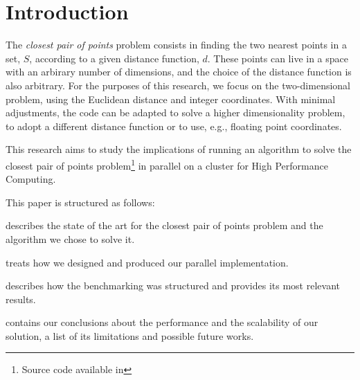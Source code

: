 \section{Introduction}
\label{sec:introduction}

The \textit{closest pair of points} problem consists
in finding the two nearest points in a set, $S$, according to a given distance function, $d$\cite{closest_pair_definition}.
These points can live in a space with an arbirary number of dimensions,
and the choice of the distance function is also arbitrary.
For the purposes of this research, we focus on the two-dimensional problem, using the Euclidean distance and integer coordinates.
With minimal adjustments, the code can be adapted to solve a higher dimensionality problem, to adopt a different distance function or to use, e.g., floating point coordinates.

This research aims to study the implications of running an algorithm to solve the closest pair of points problem\footnote{Source code available in } in parallel on a cluster for High Performance Computing.

This paper is structured as follows:
\begin{inlinelist}
    \item {} describes the state of the art for the closest pair of points problem and the algorithm we chose to solve it.
    \item {} treats how we designed and produced our parallel implementation.
    \item {} describes how the benchmarking was structured and
    provides its most relevant results.
    \item {} contains our conclusions about the performance and the scalability of our solution, a list of its limitations and possible future works.
\end{inlinelist}
